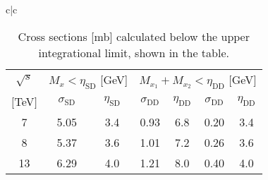 \documentclass[12pt]{article}
\begin{document}
\begin{table}[p] %
  \centering
  \caption{\label{tab:cs.SD.DD.res} Cross sections [mb] calculated below the upper integrational limit, shown in the table.}
  \begin{tabular}{c|c}
     \begin{tabular}{|c||c|c||c|c||c|c}
       \hline
       $\sqrt{s}$&\multicolumn{2}{c||}{$M_x<\eta_\mathrm{SD}$ [GeV]}&\multicolumn{4}{c}{$M_{x_1}+M_{x_2}<\eta_\mathrm{DD}$ [GeV]}\\ \cline{2-7}
 $[$TeV$]$&$\sigma_\mathrm{SD}$&$\eta_\mathrm{SD}$&
            $\sigma_\mathrm{DD}$&$\eta_\mathrm{DD}$&
            $\sigma_\mathrm{DD}$&$\eta_\mathrm{DD}$       \\ \hline
        7& 5.05&3.4& 0.93&6.8& 0.20&3.4\\
        8& 5.37&3.6& 1.01&7.2& 0.26&3.6\\
       13& 6.29&4.0& 1.21&8.0& 0.40&4.0\\ \hline
     \end{tabular}%
  \end{tabular}%
\end{table}
\end{document}
